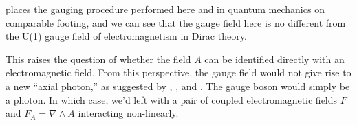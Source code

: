 \documentclass{article}
\begin{document}
  places the gauging procedure performed here and in quantum mechanics on comparable footing, and we can see that the gauge field here is no different from the U(1) gauge field of electromagnetism in Dirac theory.

  This raises the question of whether the field $A$ can be identified directly with an electromagnetic field. From this perspective, the gauge field would not give rise to a new ``axial photon,'' as suggested by \cite{naik}, \cite{malik}, and \cite{pmn}. The gauge boson would simply be a photon. In which case, we'd left with a pair of coupled electromagnetic fields $F$ and $F_A = \nabla \wedge A$ interacting non-linearly.








\end{document}
